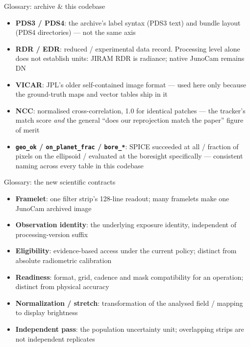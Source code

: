 \documentclass[aspectratio=169,11pt]{beamer}
\newcommand{\currevsec}{}
\newcommand{\revsec}[1]{\gdef\currevsec{#1}}
\begin{document}
\begin{frame}{Glossary: archive \& this codebase}
  \revsec{8}
  \scriptsize
  \begin{itemize}
    \item \textbf{PDS3 / PDS4}: the archive's label syntax (PDS3 text) and bundle layout (PDS4 directories) --- not the same axis
    \item \textbf{RDR / EDR}: reduced / experimental data record. Processing level alone does not establish units: JIRAM RDR is radiance; native JunoCam remains DN
    \item \textbf{VICAR}: JPL's older self-contained image format --- used here only because the ground-truth maps and vector tables ship in it
    \item \textbf{NCC}: normalised cross-correlation, 1.0 for identical patches --- the tracker's match score \emph{and} the general ``does our reprojection match the paper'' figure of merit
    \item \textbf{\texttt{geo\_ok} / \texttt{on\_planet\_frac} / \texttt{bore\_*}}: SPICE succeeded at all / fraction of pixels on the ellipsoid / evaluated at the boresight specifically --- consistent naming across every table in this codebase
  \end{itemize}
\end{frame}

\begin{frame}{Glossary: the new scientific contracts}
  \revsec{8}
\small
  \begin{itemize}
    \item \textbf{Framelet}: one filter strip's 128-line readout; many framelets make one JunoCam archived image
    \item \textbf{Observation identity}: the underlying exposure identity, independent of processing-version suffix
    \item \textbf{Eligibility}: evidence-based access under the current policy; distinct from absolute radiometric calibration
    \item \textbf{Readiness}: format, grid, cadence and mask compatibility for an operation; distinct from physical accuracy
    \item \textbf{Normalization / stretch}: transformation of the analysed field / mapping to display brightness
    \item \textbf{Independent pass}: the population uncertainty unit; overlapping strips are not independent replicates
  \end{itemize}
\end{frame}
\end{document}
